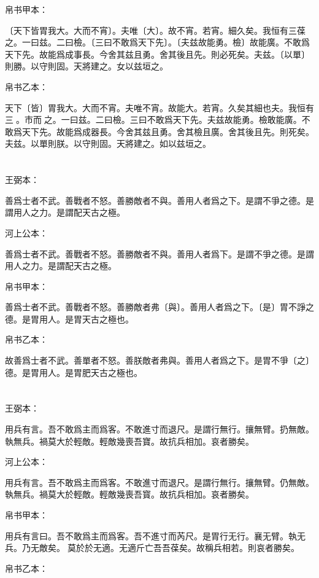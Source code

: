 \documentclass[a5paper]{ctexbook}
\begin{document}
    帛书甲本：

    〔天下皆胃我大。大而不宵〕。夫唯〔大〕。故不宵。若宵。細久矣。我恒有三葆之。一曰兹。二曰檢。〔三曰不敢爲天下先〕。〔夫兹故能勇。檢〕故能廣。不敢爲天下先。故能爲成事長。今舍其兹且勇。舍其後且先。則必死矣。夫兹。〔以單〕則勝。以守則固。天將建之。女以兹垣之。

    帛书乙本：

    天下〔皆〕胃我大。大而不宵。夫唯不宵。故能大。若宵。久矣其細也夫。我恒有三𤥯。市而𤥯之。一曰兹。二曰檢。三曰不敢爲天下先。夫兹故能勇。檢敢能廣。不敢爲天下先。故能爲成器長。今舍其兹且勇。舍其檢且廣。舍其後且先。則死矣。夫兹。以單則朕。以守則固。天將建之。如以兹垣之。

    \chapter{}
    王弼本：

    善爲士者不武。善戰者不怒。善勝敵者不與。善用人者爲之下。是謂不爭之德。是謂用人之力。是謂配天古之極。

    河上公本：

    善爲士者不武。善戰者不怒。善勝敵者不與。善用人者爲下。是謂不爭之德。是謂用人之力。是謂配天古之極。

    帛书甲本：

    善爲士者不武。善戰者不怒。善勝敵者弗〔與〕。善用人者爲之下。〔是〕胃不諍之德。是胃用人。是胃天古之極也。

    帛书乙本：

    故善爲士者不武。善單者不怒。善朕敵者弗與。善用人者爲之下。是胃不爭〔之〕德。是胃用人。是胃肥天古之極也。

    \chapter{}
    王弼本：

    用兵有言。吾不敢爲主而爲客。不敢進寸而退尺。是謂行無行。攘無臂。扔無敵。執無兵。禍莫大於輕敵。輕敵幾喪吾寶。故抗兵相加。哀者勝矣。

    河上公本：

    用兵有言。吾不敢爲主而爲客。不敢進寸而退尺。是謂行無行。攘無臂。仍無敵。執無兵。禍莫大於輕敵。輕敵幾喪吾寳。故抗兵相加。哀者勝矣。

    帛书甲本：

    用兵有言曰。吾不敢爲主而爲客。吾不進寸而芮尺。是胃行无行。襄无臂。執无兵。乃无敵矣。𢢸莫於於无適。无適斤亡吾吾葆矣。故稱兵相若。則哀者勝矣。

    帛书乙本：
\end{document}
